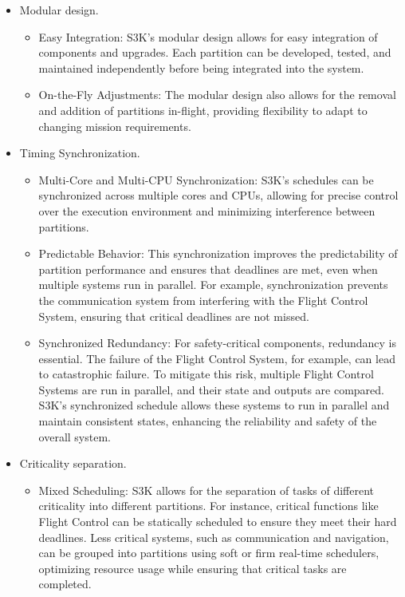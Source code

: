 \begin{itemize}
	\item Modular design. 
		\begin{itemize}			
			\item Easy Integration: 
				S3K's modular design allows for easy integration of components and upgrades. 
				Each partition can be developed, tested, and maintained independently before being integrated into the system.
			\item On-the-Fly Adjustments: 
				The modular design also allows for the removal and addition of partitions in-flight, providing flexibility to adapt to changing mission requirements.
		\end{itemize}
	\item Timing Synchronization. 
		\begin{itemize}
			\item Multi-Core and Multi-CPU Synchronization: 
				S3K's schedules can be synchronized across multiple cores and CPUs, allowing for precise control over the execution environment and minimizing interference between partitions.
			\item Predictable Behavior: 
				This synchronization improves the predictability of partition performance and ensures that deadlines are met, even when multiple systems run in parallel. 
				For example, synchronization prevents the communication system from interfering with the Flight Control System, ensuring that critical deadlines are not missed.
			\item Synchronized Redundancy: 
				For safety-critical components, redundancy is essential. 
				The failure of the Flight Control System, for example, can lead to catastrophic failure. 
				To mitigate this risk, multiple Flight Control Systems are run in parallel, and their state and outputs are compared.
				S3K's synchronized schedule allows these systems to run in parallel and maintain consistent states, enhancing the reliability and safety of the overall system.
		\end{itemize}
	\item Criticality separation.
		\begin{itemize}			
			\item Mixed Scheduling: 
				S3K allows for the separation of tasks of different criticality into different partitions. 
				For instance, critical functions like Flight Control can be statically scheduled to ensure they meet their hard deadlines.
				Less critical systems, such as communication and navigation, can be grouped into partitions using soft or firm real-time schedulers, optimizing resource usage while ensuring that critical tasks are completed.

\end{itemize}
\end{itemize}
